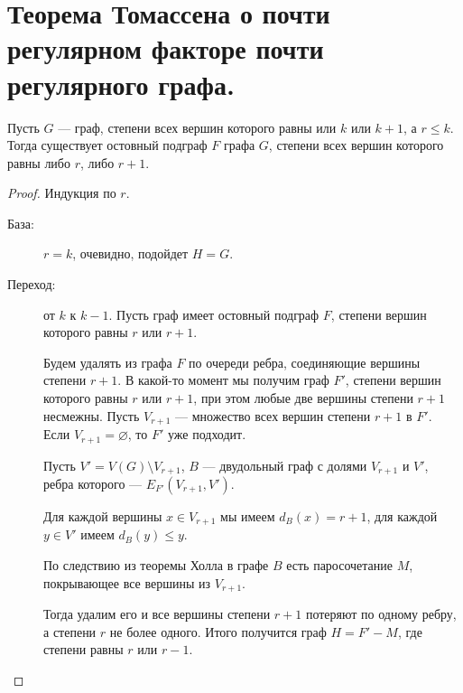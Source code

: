 \section{Теорема Томассена о почти регулярном факторе почти регулярного графа.}
\begin{theorem}[Томассен, 1981]
    Пусть $G$ --- граф, степени всех вершин которого равны или $k$ или $k+1$, а $r \le k$. Тогда существует остовный подграф $F$ графа $G$, степени всех вершин которого равны либо $r$, либо $r+1$.
\end{theorem}
\begin{proof}
    Индукция по $r$. 
	\begin{description}
		\item[База:] $r = k$, очевидно, подойдет $H = G$.
		\item[Переход:] от $k$ к $k-1$. Пусть граф имеет остовный подграф $F$, степени вершин которого равны $r$ или $r+1$.

			Будем удалять из графа $F$ по очереди ребра, соединяющие вершины степени $r+1$. В какой-то момент мы получим граф  $F'$, степени вершин которого равны $r$ или $r+1$, при этом любые две вершины степени $r+1$ несмежны.
			Пусть $V_{r+1}$ --- множество всех вершин степени  $r+1$ в $F'$. Если $V_{r+1} = \varnothing$, то $F'$ уже подходит.

			Пусть $V' = V(G) \setminus V_{r+1}$, $B$ --- двудольный граф с долями $V_{r+1}$ и $V'$, ребра которого --- $E_{F'}(V_{r+1}, V')$.

			Для каждой вершины $x \in  V_{r+1}$ мы имеем $d_B(x)= r+1$, для каждой $y \in V'$ имеем $d_B(y) \le y$.

			По следствию из теоремы Холла в графе $B$ есть паросочетание $M$, покрывающее все вершины из $V_{r+1}$.

			Тогда удалим его и все вершины степени $r+1$ потеряют по одному ребру, а степени $r$ не более одного. Итого получится граф $H = F' -M$, где степени равны $r$ или $r-1$.
	\end{description}
\end{proof}

